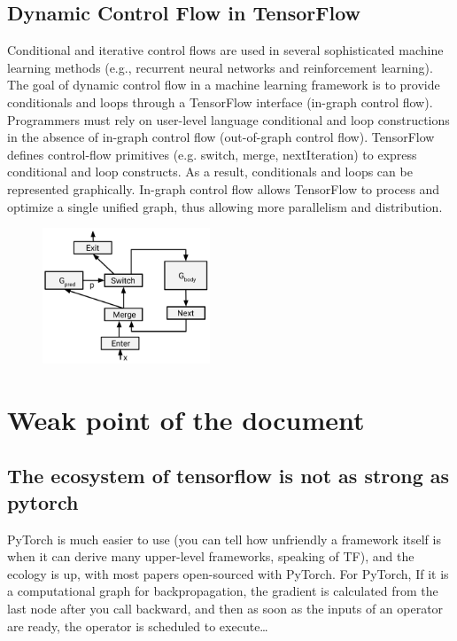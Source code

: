 \documentclass[acmlarge]{acmart}
\begin{document}
\subsection{Dynamic Control Flow in TensorFlow}
Conditional and iterative control flows are used in several sophisticated machine learning methods (e.g., recurrent neural networks and reinforcement learning). The goal of dynamic control flow in a machine learning framework is to provide conditionals and loops through a TensorFlow interface (in-graph control flow). Programmers must rely on user-level language conditional and loop constructions in the absence of in-graph control flow (out-of-graph control flow). TensorFlow defines control-flow primitives (e.g. switch, merge, nextIteration) to express conditional and loop constructs. As a result, conditionals and loops can be represented graphically. In-graph control flow allows TensorFlow to process and optimize a single unified graph, thus allowing more parallelism and distribution.
\begin{figure}[htbp]
  \centering
  \includegraphics[width=5cm]{./primitive.png}
\end{figure}
\section{Weak point of the document}
\subsection{The ecosystem of tensorflow is not as strong as pytorch}
PyTorch is much easier to use (you can tell how unfriendly a framework itself is when it can derive many upper-level frameworks, speaking of TF), and the ecology is up, with most papers open-sourced with PyTorch. For PyTorch, If it is a computational graph for backpropagation, the gradient is calculated from the last node after you call backward, and then as soon as the inputs of an operator are ready, the operator is scheduled to execute\dots
\end{document}
